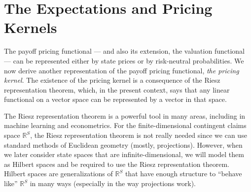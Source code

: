 \documentclass[\topdir/lecture\_notes.tex]{subfiles}
\begin{document}

\section{The Expectations and Pricing Kernels}
The payoff pricing functional --- and also its extension, the valuation functional --- can be represented either by state prices or by risk-neutral probabilities. We now derive another representation of the payoff pricing functional, \emph{the pricing kernel}. The existence of the pricing kernel is a consequence of the Riesz representation theorem, which, in the present context, says that any linear functional on a vector space can be represented by a vector in that space.

The Riesz representation theorem is a powerful tool in many areas, including in machine learning and econometrics. For the finite-dimensional contingent claims space \(\mathbb{R}^{S}\), the Riesz representation theorem is not really needed since we can use standard methods of Euclidean geometry (mostly, projections). However, when we later consider state spaces that are infinite-dimensional, we will model them as Hilbert spaces and be required to use the Riesz representation theorem. Hilbert spaces are generalizations of \(\mathbb{R}^S\) that have enough structure to ``behave like'' \(\mathbb{R}^S\) in many ways (especially in the way projections work).
\end{document}
